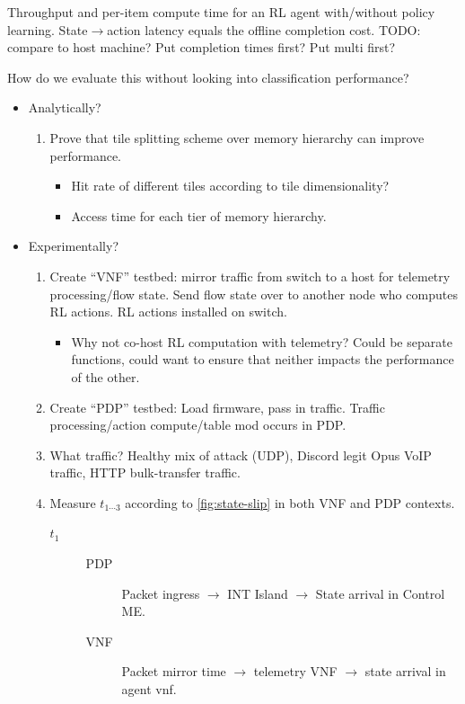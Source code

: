 \documentclass[sigconf,natbib=false]{acmart}
\begin{document}
\begin{table}
	\caption{Throughput and per-item compute time for an RL agent with/without policy learning. State$\rightarrow$action latency equals the offline completion cost. TODO: compare to host machine? Put completion times first? Put multi first?}
\end{table}

How do we evaluate this without looking into classification performance?
\begin{itemize}
	\item Analytically?
	\begin{enumerate}
		\item Prove that tile splitting scheme over memory hierarchy can improve performance.
		\begin{itemize}
			\item Hit rate of different tiles according to tile dimensionality?
			\item Access time for each tier of memory hierarchy.
		\end{itemize}
	\end{enumerate}
	\item Experimentally?
	\begin{enumerate}
		\item Create ``VNF'' testbed: mirror traffic from switch to a host for telemetry processing/flow state. Send flow state over to another node who computes RL actions. RL actions installed on switch.
		\begin{itemize}
			\item Why not co-host RL computation with telemetry? Could be separate functions, could want to ensure that neither impacts the performance of the other.
		\end{itemize}
		\item Create ``PDP'' testbed: Load firmware, pass in traffic. Traffic processing/action compute/table mod occurs in PDP.
		\item What traffic? Healthy mix of attack (UDP), Discord legit Opus VoIP traffic, HTTP bulk-transfer traffic.
		\item Measure $t_{1 \cdots 3}$ according to \cref{fig:state-slip} in both VNF and PDP contexts.
		\begin{description}
			\item[$t_1$]
			\begin{description}
				\item[PDP] Packet ingress $\rightarrow$ INT Island $\rightarrow$ State arrival in Control ME.
				\item[VNF] Packet mirror time $\rightarrow$ telemetry VNF $\rightarrow$ state arrival in agent vnf.
			\end{description}
		

\end{description}
\end{enumerate}
\end{itemize}
\end{document}
